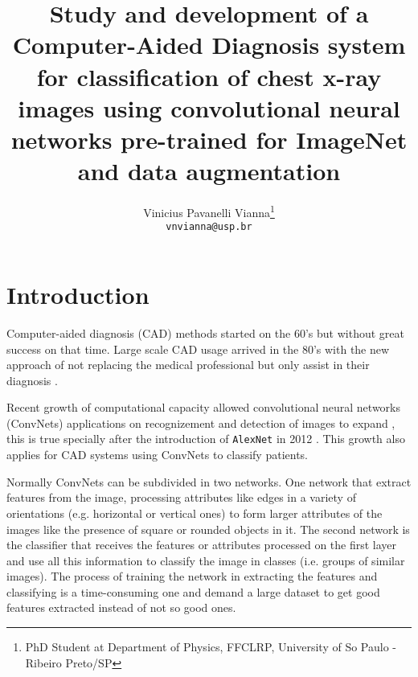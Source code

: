 \documentclass[twocolumn]{article}
\title{Study and development of a Computer-Aided Diagnosis system for classification of chest x-ray images using convolutional neural networks pre-trained for ImageNet and data augmentation}
\author{Vinicius Pavanelli Vianna\thanks{PhD Student at Department of Physics, FFCLRP, University of So Paulo - Ribeiro Preto/SP}\\
\texttt{vnvianna@usp.br}}
\newcommand{\mycite}{\cite}
\begin{document}
\saythanks
\section{Introduction}
Computer-aided diagnosis (CAD) methods started on the 60's\mycite{CAD_1960} but without great success on that time. Large scale CAD usage arrived in the 80's with the new approach of not replacing the medical professional but only assist in their diagnosis \mycite{CAD_review}.

Recent growth of computational capacity allowed convolutional neural networks (ConvNets) applications on recognizement and detection of images to expand \mycite{Lecun_2015}, this is true specially after the introduction of \texttt{AlexNet} in 2012 \mycite{ImageNet}. This growth also applies for CAD systems using ConvNets to classify patients.

Normally ConvNets can be subdivided in two networks. One network that extract features from the image, processing attributes like edges in a variety of orientations (e.g. horizontal or vertical ones) to form larger attributes of the images like the presence of square or rounded objects in it. The second network is the classifier that receives the features or attributes processed on the first layer and use all this information to classify the image in classes (i.e. groups of similar images). The process of training the network in extracting the features and classifying is a time-consuming one and demand a large dataset to get good features extracted instead of not so good ones.
\end{document}
